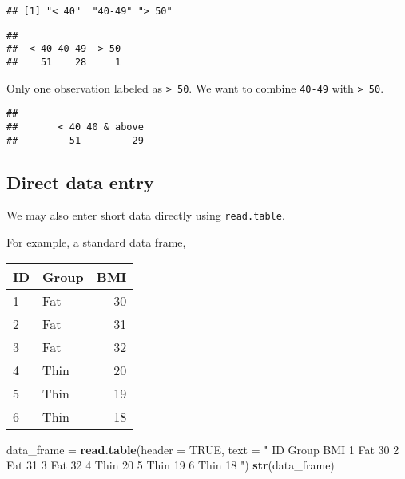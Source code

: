 \documentclass[]{book}
\newenvironment{Shaded}{\begin{snugshade}}{\end{snugshade}}
\newcommand{\KeywordTok}[1]{\textcolor[rgb]{0.13,0.29,0.53}{\textbf{{#1}}}}
\newcommand{\DataTypeTok}[1]{\textcolor[rgb]{0.13,0.29,0.53}{{#1}}}
\newcommand{\StringTok}[1]{\textcolor[rgb]{0.31,0.60,0.02}{{#1}}}
\newcommand{\CommentTok}[1]{\textcolor[rgb]{0.56,0.35,0.01}{\textit{{#1}}}}
\newcommand{\OtherTok}[1]{\textcolor[rgb]{0.56,0.35,0.01}{{#1}}}
\newcommand{\NormalTok}[1]{{#1}}
\theoremstyle{definition}
\theoremstyle{definition}
\theoremstyle{remark}
\begin{document}
\begin{verbatim}
## [1] "< 40"  "40-49" "> 50"
\end{verbatim}

\begin{Shaded}
\end{Shaded}

\begin{verbatim}
## 
##  < 40 40-49  > 50 
##    51    28     1
\end{verbatim}

Only one observation labeled as \texttt{\textgreater{}\ 50}. We want to
combine \texttt{40-49} with \texttt{\textgreater{}\ 50}.

\begin{Shaded}
\end{Shaded}

\begin{verbatim}
## 
##       < 40 40 & above 
##         51         29
\end{verbatim}

\subsection{Direct data entry}\label{direct-data-entry}

We may also enter short data directly using \texttt{read.table}.

For example, a standard data frame,

\begin{longtable}[]{@{}llr@{}}
\toprule
ID & Group & BMI\tabularnewline
\midrule
\endhead
1 & Fat & 30\tabularnewline
2 & Fat & 31\tabularnewline
3 & Fat & 32\tabularnewline
4 & Thin & 20\tabularnewline
5 & Thin & 19\tabularnewline
6 & Thin & 18\tabularnewline
\bottomrule
\end{longtable}

\begin{Shaded}
\begin{Highlighting}[]
\NormalTok{data_frame =}\StringTok{ }\KeywordTok{read.table}\NormalTok{(}\DataTypeTok{header =} \OtherTok{TRUE}\NormalTok{, }\DataTypeTok{text =} \StringTok{"}
\StringTok{ID Group BMI}
\StringTok{1 Fat 30}
\StringTok{2 Fat 31}
\StringTok{3 Fat 32}
\StringTok{4 Thin 20}
\StringTok{5 Thin 19}
\StringTok{6 Thin 18}
\StringTok{"}\NormalTok{)}
\KeywordTok{str}\NormalTok{(data_frame)}
\end{Highlighting}
\end{Shaded}
\end{document}
